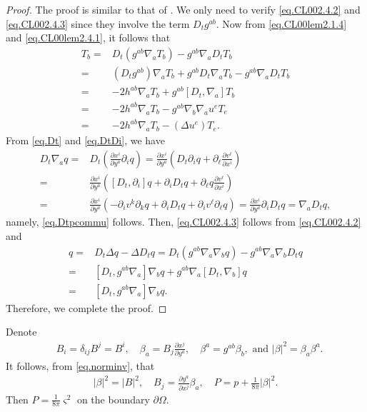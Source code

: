 \documentclass[12pt,reqno]{amsart}
\numberwithin{equation}{section}
\theoremstyle{definition}
\theoremstyle{remark}
\begin{document}
\begin{proof}
  The proof is similar to that of \cite[Lemma 2.4]{CL00}. We only need to verify \eqref{eq.CL002.4.2} and \eqref{eq.CL002.4.3} since they involve the term $D_t g^{ab}$. Now from \eqref{eq.CL00lem2.1.4} and \eqref{eq.CL00lem2.4.1}, it follows that
  \begin{align*}
    [D_t, g^{ab}{\nabla}_a]T_b=&D_t(g^{ab}{\nabla}_a T_b)-g^{ab}{\nabla}_a D_t T_b\\
    =&(D_tg^{ab}) {\nabla}_a T_b+g^{ab} D_t{\nabla}_a T_b-g^{ab}{\nabla}_a D_t T_b\\
    =&-2h^{ab}{\nabla}_a T_b+ g^{ab}[D_t,{\nabla}_a]T_b\\
    =&-2h^{ab}{\nabla}_a T_b-g^{ab}{\nabla}_b{\nabla}_a u^e T_e\\
    =&-2h^{ab}{\nabla}_a T_b-(\Delta u^e) T_e.
  \end{align*}
  From \eqref{eq.Dt} and \eqref{eq.DtDi}, we have
  \begin{align*}
    D_t{\nabla}_a q=&D_t\left(\frac{{\partial} x^i}{{\partial} y^a} {\partial}_i q\right)=\frac{{\partial} x^i}{{\partial} y^a}\left(D_t {\partial}_iq+{\partial}_\ell\frac{{\partial} v^\ell}{{\partial} x^i}\right)\\
    =&\frac{{\partial} x^i}{{\partial} y^a}\left([D_t,{\partial}_i]q+ {\partial}_iD_tq+{\partial}_\ell q\frac{{\partial} v^\ell}{{\partial} x^i}\right)\\
    =&\frac{{\partial} x^i}{{\partial} y^a}\left(-{\partial}_i v^k{\partial}_k q+ {\partial}_iD_tq+{\partial}_i v^\ell{\partial}_\ell q\right)=\frac{{\partial} x^i}{{\partial} y^a}{\partial}_iD_tq={\nabla}_a D_t q,
  \end{align*}
  namely, \eqref{eq.Dtpcommu} follows.  Then, \eqref{eq.CL002.4.3} follows from \eqref{eq.CL002.4.2} and
  \begin{align*}
    [D_t,\Delta]q=&D_t\Delta q-\Delta D_t q=D_t(g^{ab}{\nabla}_a{\nabla}_b q)-g^{ab}{\nabla}_a{\nabla}_b D_tq\\
    =&[D_t,g^{ab}{\nabla}_a]{\nabla}_b q+g^{ab}{\nabla}_a[D_t,{\nabla}_b]q\\
    =&[D_t,g^{ab}{\nabla}_a]{\nabla}_b q.
  \end{align*}
  Therefore, we complete the proof.
\end{proof}

Denote
\begin{align}
  &B_i=\delta_{ij}B^j=B^i, \quad \beta_a=B_j\frac{{\partial} x^j}{{\partial} y^a},\quad \beta^a=g^{ab}\beta_b, \text{ and }
   |\beta|^2=\beta_a\beta^a.
\end{align}
It follows, from \eqref{eq.norminv}, that
\begin{align}\label{eq.beta}
  |\beta|^2=|{B}|^2, \quad B_j=\frac{{\partial} y^a}{{\partial} x^j}\beta_a, \quad{P }=p+\frac{1}{8\pi}|\beta|^2.
\end{align}
Then $P=\frac{1}{8\pi} {\varsigma}^2$ on the boundary ${\partial}\Omega$.
\end{document}
